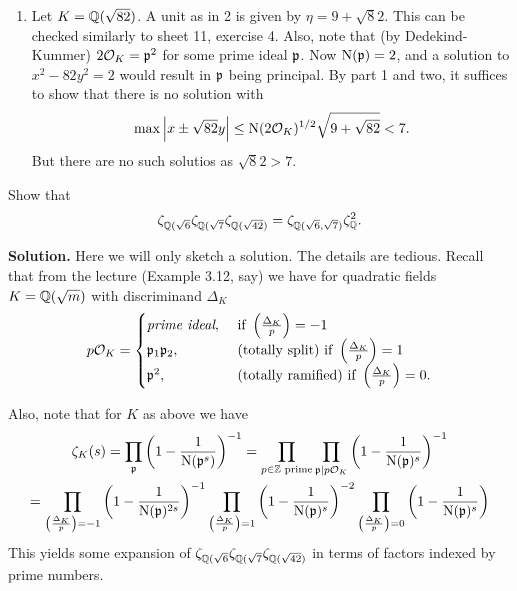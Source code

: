 \documentclass[a4paper,11pt]{article}
\begin{document}
\begin{enumerate}[wide, labelindent=0pt]
    \item Let $K = \mathbb{Q}(\sqrt {82})$. A unit as in 2 is given by $\eta = 9 + \sqrt 82$. 
        This can be checked similarly to sheet 11, exercise 4. 
        Also, note that (by Dedekind-Kummer) $2 \mathcal{O}_K= \mathfrak{p}^2$ for some prime
        ideal $\mathfrak{p}$. Now $\operatorname{N}(\mathfrak{p})=2$, and a solution to $x^2 - 82y^2 = 2$
        would result in $\mathfrak{p}$ being principal. 
        By part 1 and two, it suffices to show that there is no solution with
        $$\max \left\lvert x \pm \sqrt {82} y \right\rvert \leq \operatorname{N}(2 \mathcal{O}_K)^{1/2} \sqrt{9 + \sqrt{82}}
        < 7.$$
        But there are no such solutios as $\sqrt 82 > 7$. 
\end{enumerate}


Show that 
\begin{equation*}
    \zeta_{\mathbb{Q}(\sqrt 6} \zeta_{\mathbb{Q}(\sqrt 7} \zeta_{\mathbb{Q}(\sqrt {42})} 
    = \zeta_{\mathbb{Q}(\sqrt 6, \sqrt 7)} \zeta_{\mathbb{Q}}^2.
\end{equation*}

\textbf{Solution.} 
Here we will only sketch a solution. The details are tedious.
Recall that from the lecture (Example 3.12, say) we have for quadratic fields
$K = \mathbb{Q}(\sqrt m)$ with discriminand $\Delta_K$
\begin{equation*}
    p\mathcal{O}_K = 
    \begin{cases}
        \textit{prime ideal}, &\text{ if } \left( \frac{\Delta_K}{p} \right) = -1 \\
        \mathfrak{p}_1 \mathfrak{p}_2, &\text{ (totally split) if } \left( \frac{\Delta_K}{p} \right) = 1 \\
        \mathfrak{p}^2, &\text{ (totally ramified) if } \left( \frac{\Delta_K}{p} \right) = 0.
    \end{cases}
\end{equation*}

Also, note that for $K$ as above we have
\begin{multline*}
    \zeta_K(s) = \prod_{\mathfrak{p}} \left( 1 - \frac{1}{\operatorname{N}(\mathfrak{p}^s)} \right)^{-1}  = 
    \prod_{p \in \mathbb{Z} \text{ prime}} \prod_{\mathfrak{p} \mid p \mathcal{O}_K} \left(1-
    \frac1{\operatorname{N}(\mathfrak{p})^s}\right)^{-1} \\
    = \prod_{\left( \frac{\Delta_K}{p} \right) = -1}\left( 1 - \frac{1}{\operatorname{N}(\mathfrak{p})^{2s}}\right)^{-1}
        \prod_{\left( \frac{\Delta_K}{p} \right) = 1}\left( 1 - \frac{1}{\operatorname{N}(\mathfrak{p})^{s}}\right)^{-2}
        \prod_{\left( \frac{\Delta_K}{p} \right) = 0}\left( 1 - \frac{1}{\operatorname{N}(\mathfrak{p})^{s}}\right)
\end{multline*}
This yields some expansion of $\zeta_{\mathbb{Q}(\sqrt 6} \zeta_{\mathbb{Q}(\sqrt 7}
\zeta_{\mathbb{Q}(\sqrt {42})}$ in terms of factors indexed by prime numbers.
\end{document}
